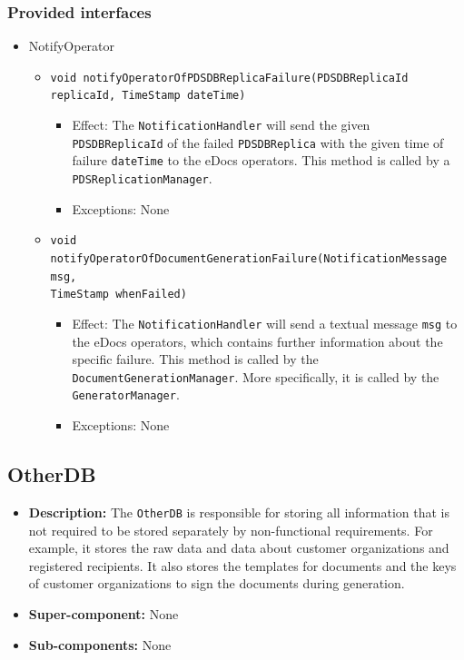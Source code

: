 \documentclass[a4paper,10pt]{article}
\begin{document}
\subsubsection*{Provided interfaces}
\begin{itemize}
    \item NotifyOperator
    \begin{itemize}
        \item \texttt{void notifyOperatorOfPDSDBReplicaFailure(PDSDBReplicaId replicaId, TimeStamp dateTime)}
        \begin{itemize}
            \item Effect: The \texttt{NotificationHandler} will send the given \texttt{PDSDBReplicaId} of the failed \texttt{PDSDBReplica} with the given time of failure \texttt{dateTime} to the eDocs operators. This method is called by a \texttt{PDSReplicationManager}.
            \item Exceptions: None
        \end{itemize}
        
        \item \texttt{void notifyOperatorOfDocumentGenerationFailure(NotificationMessage msg,\\ TimeStamp whenFailed)}
        \begin{itemize}
            \item Effect: The \texttt{NotificationHandler} will send a textual message \texttt{msg} to the eDocs operators, which contains further information about the specific failure. This method is called by the \texttt{DocumentGenerationManager}. More specifically, it is called by the \texttt{GeneratorManager}.
            \item Exceptions: None
        \end{itemize}
    \end{itemize}
\end{itemize}

\subsection{OtherDB}
\begin{itemize}
    \item \textbf{Description:} The \texttt{OtherDB} is responsible for storing all information that is not required to be stored separately by non-functional requirements. For example, it stores the raw data and data about customer organizations and registered recipients. It also stores the templates for documents and the keys of customer organizations to sign the documents during generation.
    \item \textbf{Super-component:} None
    \item \textbf{Sub-components:} None
\end{itemize}
\end{document}

